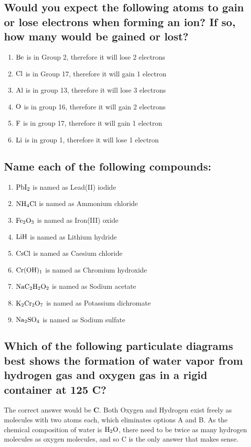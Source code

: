 \documentclass[11pt]{article}
\begin{document}
\subsection{Would you expect the following atoms to gain or lose electrons when forming an ion? If so, how many would be gained or lost?}
\label{sec:orgdbff901}
\begin{enumerate}
\item \(\ce{Be}\) is in Group 2, therefore it will lose 2 electrons
\item \(\ce{Cl}\) is in Group 17, therefore it will gain 1 electron
\item \(\ce{Al}\) is in group 13, therefore it will lose 3 electrons
\item \(\ce{O}\) is in group 16, therefore it will gain 2 electrons
\item \(\ce{F}\) is in group 17, therefore it will gain 1 electron
\item \(\ce{Li}\) is in group 1, therefore it will lose 1 electron
\end{enumerate}

\subsection{Name each of the following compounds:}
\label{sec:orgd90272d}
\begin{enumerate}
\item \(\ce{PbI2}\) is named as Lead(II) iodide
\item \(\ce{NH4Cl}\) is named as Ammonium chloride
\item \(\ce{Fe2O3}\) is named as Iron(III) oxide
\item \(\ce{LiH}\) is named as Lithium hydride
\item \(\ce{CsCl}\) is named as Caesium chloride
\item \(\ce{Cr(OH)1}\) is named as Chromium hydroxide
\item \(\ce{NaC2H2O2}\) is named as Sodium acetate
\item \(\ce{K2Cr2O7}\) is named as Potassium dichromate
\item \(\ce{Na2SO4}\) is named as Sodium sulfate
\end{enumerate}

\subsection{Which of the following particulate diagrams best shows the formation of water vapor from hydrogen gas and oxygen gas in a rigid container at 125\textdegree{} C?}
\label{sec:orge3b0856}
The correct answer would be \textbf{C}. Both Oxygen and Hydrogen exist freely as molecules with two atoms each, which eliminates options A and B. As the chemical composition of water is \(\ce{H2O}\), there need to be twice as many hydrogen molecules as oxygen molecules, and so C is the only answer that makes sense.
\end{document}

